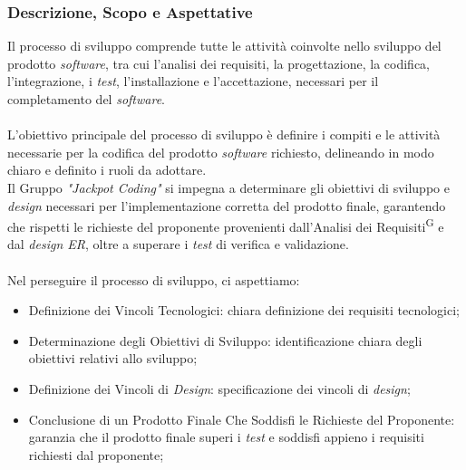 \documentclass[5pt]{article}
\begin{document}
\subsubsection{Descrizione, Scopo e Aspettative }
Il processo di sviluppo comprende tutte le attività coinvolte nello sviluppo del prodotto \textit{software}, tra cui l'analisi dei requisiti, la progettazione, la codifica, l'integrazione, i \textit{test}, l'installazione e l'accettazione, necessari per il completamento del \textit{software}.\\\\
L'obiettivo principale del processo di sviluppo è definire i compiti e le attività necessarie per la codifica del prodotto \textit{software} richiesto, delineando in modo chiaro e definito i ruoli da adottare.\\
Il Gruppo \textit{"Jackpot Coding"} si impegna a determinare gli obiettivi di sviluppo e \textit{design} necessari per l'implementazione corretta del prodotto finale, garantendo che rispetti le richieste del proponente provenienti dall'Analisi dei Requisiti\textsuperscript{G} e dal \textit{design ER}, oltre a superare i \textit{test} di verifica e validazione.\\\\
Nel perseguire il processo di sviluppo, ci aspettiamo:
\begin{itemize}
    \item Definizione dei Vincoli Tecnologici: chiara definizione dei requisiti tecnologici;
    \item Determinazione degli Obiettivi di Sviluppo: identificazione chiara degli obiettivi relativi allo sviluppo;
    \item Definizione dei Vincoli di \textit{Design}: specificazione dei vincoli di \textit{design};
    \item Conclusione di un Prodotto Finale Che Soddisfi le Richieste del Proponente: garanzia che il prodotto finale superi i \textit{test} e soddisfi appieno i requisiti richiesti dal proponente;
\end{itemize}
\end{document}
